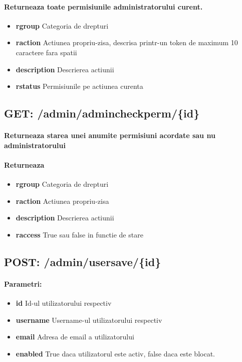 \paragraph{Returneaza toate permisiunile administratorului curent.}
\begin{itemize}
\item \textbf{rgroup}
 Categoria de drepturi 
\item \textbf{raction}
 Actiunea propriu-zisa, descrisa printr-un token de maximum 10 caractere fara spatii
\item \textbf{description}
 Descrierea actiunii
\item \textbf{rstatus}
 Permisiunile pe actiunea curenta
 \end{itemize}
 \subsection*{GET: /admin/admincheckperm/\{id\}}

\paragraph{Returneaza starea unei anumite permisiuni acordate sau nu administratorului}
\paragraph{Returneaza}
\begin{itemize}
\item \textbf{rgroup}
 Categoria de drepturi 
\item \textbf{raction}
 Actiunea propriu-zisa
\item \textbf{description}
 Descrierea actiunii
\item \textbf{raccess}
 True sau false in functie de stare
 \end{itemize}
 \subsection*{POST: /admin/usersave/\{id\}}

\paragraph{Parametri:}
\begin{itemize}
\item \textbf{id}
 Id-ul utilizatorului respectiv
\item \textbf{username}
 Username-ul utilizatorului respectiv
\item \textbf{email}
 Adresa de email a utilizatorului
\item \textbf{enabled}
 True daca utilizatorul este activ, false daca este blocat. 
 \end{itemize}
